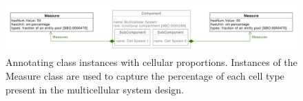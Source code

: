 \begin{figure}[ht]
	\begin{center}
		\includegraphics[width=\textwidth]{uml/cell_ratios}
		\caption[]{Annotating class instances with cellular proportions. Instances of the Measure class are used to capture the percentage of each cell type present in the multicellular system design.
		}
		\label{uml:cell_ratios}
	\end{center}
\end{figure}
